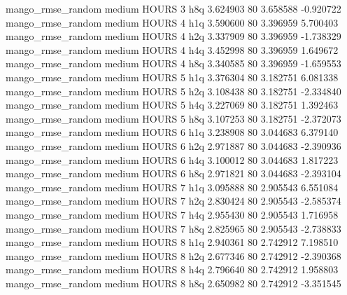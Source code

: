 mango_rmse_random     medium    HOURS                 3                  h8q  3.624903 80       3.658588          -0.920722
mango_rmse_random     medium    HOURS                 4                  h1q  3.590600 80       3.396959           5.700403
mango_rmse_random     medium    HOURS                 4                  h2q  3.337909 80       3.396959          -1.738329
mango_rmse_random     medium    HOURS                 4                  h4q  3.452998 80       3.396959           1.649672
mango_rmse_random     medium    HOURS                 4                  h8q  3.340585 80       3.396959          -1.659553
mango_rmse_random     medium    HOURS                 5                  h1q  3.376304 80       3.182751           6.081338
mango_rmse_random     medium    HOURS                 5                  h2q  3.108438 80       3.182751          -2.334840
mango_rmse_random     medium    HOURS                 5                  h4q  3.227069 80       3.182751           1.392463
mango_rmse_random     medium    HOURS                 5                  h8q  3.107253 80       3.182751          -2.372073
mango_rmse_random     medium    HOURS                 6                  h1q  3.238908 80       3.044683           6.379140
mango_rmse_random     medium    HOURS                 6                  h2q  2.971887 80       3.044683          -2.390936
mango_rmse_random     medium    HOURS                 6                  h4q  3.100012 80       3.044683           1.817223
mango_rmse_random     medium    HOURS                 6                  h8q  2.971821 80       3.044683          -2.393104
mango_rmse_random     medium    HOURS                 7                  h1q  3.095888 80       2.905543           6.551084
mango_rmse_random     medium    HOURS                 7                  h2q  2.830424 80       2.905543          -2.585374
mango_rmse_random     medium    HOURS                 7                  h4q  2.955430 80       2.905543           1.716958
mango_rmse_random     medium    HOURS                 7                  h8q  2.825965 80       2.905543          -2.738833
mango_rmse_random     medium    HOURS                 8                  h1q  2.940361 80       2.742912           7.198510
mango_rmse_random     medium    HOURS                 8                  h2q  2.677346 80       2.742912          -2.390368
mango_rmse_random     medium    HOURS                 8                  h4q  2.796640 80       2.742912           1.958803
mango_rmse_random     medium    HOURS                 8                  h8q  2.650982 80       2.742912          -3.351545
